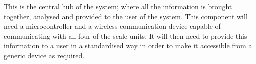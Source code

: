 This is the central hub of the system; where all the information is brought together, analysed and provided to the user of the system. This component will need a microcontroller and a wireless communication device capable of communicating with all four of the scale units. It will then need to provide this information to a user in a standardised way in order to make it accessible from a generic device as required.
